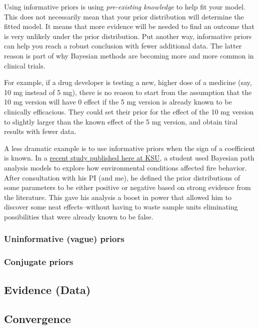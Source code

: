 \documentclass[
  13,
  letterpaper,
]{report}
\begin{document}
Using informative priors is using \emph{pre-existing knowledge} to help
fit your model. This does not necessarily mean that your prior
distribution will determine the fitted model. It means that more
evidence will be needed to find an outcome that is very unlikely under
the prior distribution. Put another way, informative priors can help you
reach a robust conclusion with fewer additional data. The latter reason
is part of why Bayesian methods are becoming more and more common in
clinical trials.

For example, if a drug developer is testing a new, higher dose of a
medicine (say, 10 mg instead of 5 mg), there is no reason to start from
the assumption that the 10 mg version will have 0 effect if the 5 mg
version is already known to be clinically efficacious. They could set
their prior for the effect of the 10 mg version to slightly larger than
the known effect of the 5 mg version, and obtain tiral results with
fewer data.

A less dramatic example is to use informative priors when the sign of a
coefficient is known. In a
\href{https://doi.org/10.1016/j.foreco.2024.122372}{recent study
published here at KSU}, a student used Bayesian path analysis models to
explore how environmental conditions affected fire behavior. After
consultation with his PI (and me), he defined the prior distributions of
some parameters to be either positive or negative based on strong
evidence from the literature. This gave his analysis a boost in power
that allowed him to discover some neat effects--without having to waste
sample units eliminating possibilities that were already known to be
false.

\subsubsection{Uninformative (vague)
priors}\label{uninformative-vague-priors}

\subsubsection{Conjugate priors}\label{conjugate-priors}

\subsection{Evidence (Data)}\label{evidence-data}

\subsection{Convergence}\label{convergence}
\end{document}
